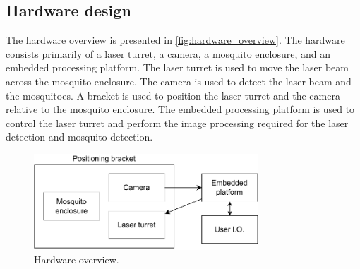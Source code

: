 \subsection{Hardware design}
The hardware overview is presented in \autoref{fig:hardware_overview}. The hardware consists primarily of a laser turret, a camera, a mosquito enclosure, and an embedded processing platform. The laser turret is used to move the laser beam across the mosquito enclosure. The camera is used to detect the laser beam and the mosquitoes. A bracket is used to position the laser turret and the camera relative to the mosquito enclosure. The embedded processing platform is used to control the laser turret and perform the image processing required for the laser detection and mosquito detection.
\begin{figure}[h]
    \centering
    \includegraphics[width=0.75\textwidth]{figures/hardware_design/hardware_overview.pdf}
    \caption{Hardware overview.}
    \label{fig:hardware_overview}
\end{figure}



